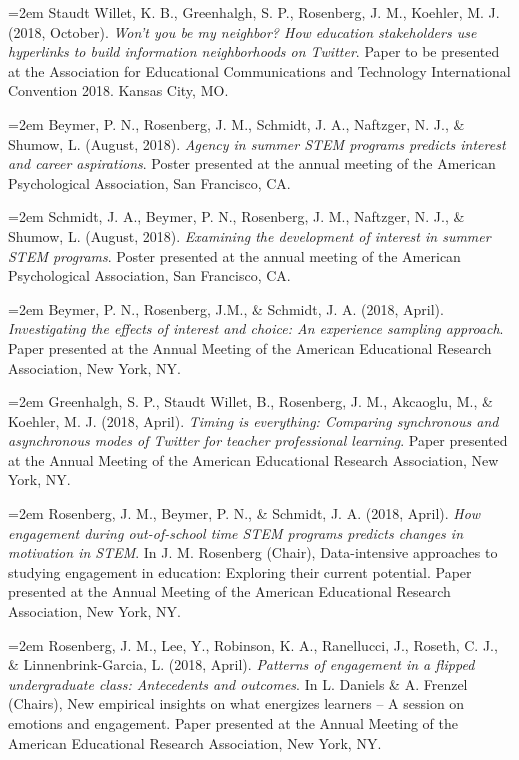 \documentclass[14,]{article}
\begin{document}
\hangindent=2em Staudt Willet, K. B., Greenhalgh, S. P., Rosenberg, J.
M., Koehler, M. J. (2018, October). \emph{Won't you be my neighbor? How
education stakeholders use hyperlinks to build information neighborhoods
on Twitter}. Paper to be presented at the Association for Educational
Communications and Technology International Convention 2018. Kansas
City, MO.

\hangindent=2em Beymer, P. N., Rosenberg, J. M., Schmidt, J. A.,
Naftzger, N. J., \& Shumow, L. (August, 2018). \emph{Agency in summer
STEM programs predicts interest and career aspirations}. Poster
presented at the annual meeting of the American Psychological
Association, San Francisco, CA.

\hangindent=2em Schmidt, J. A., Beymer, P. N., Rosenberg, J. M.,
Naftzger, N. J., \& Shumow, L. (August, 2018). \emph{Examining the
development of interest in summer STEM programs}. Poster presented at
the annual meeting of the American Psychological Association, San
Francisco, CA.

\hangindent=2em Beymer, P. N., Rosenberg, J.M., \& Schmidt, J. A. (2018,
April). \emph{Investigating the effects of interest and choice: An
experience sampling approach}. Paper presented at the Annual Meeting of
the American Educational Research Association, New York, NY.

\hangindent=2em Greenhalgh, S. P., Staudt Willet, B., Rosenberg, J. M.,
Akcaoglu, M., \& Koehler, M. J. (2018, April). \emph{Timing is
everything: Comparing synchronous and asynchronous modes of Twitter for
teacher professional learning}. Paper presented at the Annual Meeting of
the American Educational Research Association, New York, NY.

\hangindent=2em Rosenberg, J. M., Beymer, P. N., \& Schmidt, J. A.
(2018, April). \emph{How engagement during out-of-school time STEM
programs predicts changes in motivation in STEM}. In J. M. Rosenberg
(Chair), Data-intensive approaches to studying engagement in education:
Exploring their current potential. Paper presented at the Annual Meeting
of the American Educational Research Association, New York, NY.

\hangindent=2em Rosenberg, J. M., Lee, Y., Robinson, K. A., Ranellucci,
J., Roseth, C. J., \& Linnenbrink-Garcia, L. (2018, April).
\emph{Patterns of engagement in a flipped undergraduate class:
Antecedents and outcomes}. In L. Daniels \& A. Frenzel (Chairs), New
empirical insights on what energizes learners -- A session on emotions
and engagement. Paper presented at the Annual Meeting of the American
Educational Research Association, New York, NY.
\end{document}
